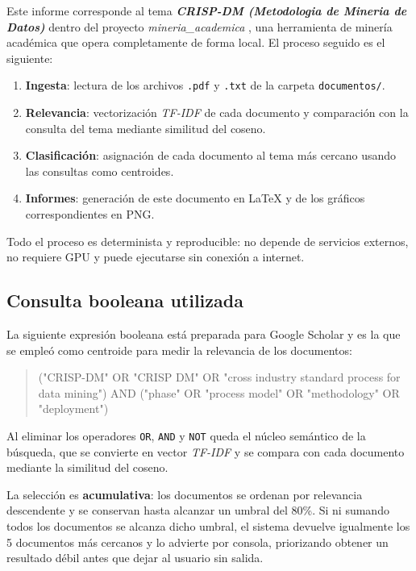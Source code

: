 \documentclass[11pt,a4paper]{article}
\newcommand{\tema}[1]{\textbf{\textit{#1}}}
\newcommand{\pcento}{\%}
\begin{document}
Este informe corresponde al tema \tema{ CRISP-DM (Metodologia de Mineria de Datos) } dentro del
proyecto \textit{ mineria\_academica }, una herramienta de minería académica que
opera completamente de forma local. El proceso seguido es el siguiente:

\begin{enumerate}
  \item \textbf{Ingesta}: lectura de los archivos \texttt{.pdf} y
        \texttt{.txt} de la carpeta \texttt{documentos/}.
  \item \textbf{Relevancia}: vectorización \textit{TF-IDF} de cada documento
        y comparación con la consulta del tema mediante similitud del coseno.
  \item \textbf{Clasificación}: asignación de cada documento al tema más
        cercano usando las consultas como centroides.
  \item \textbf{Informes}: generación de este documento en \LaTeX{} y de los
        gráficos correspondientes en PNG.
\end{enumerate}

Todo el proceso es determinista y reproducible: no depende de servicios
externos, no requiere GPU y puede ejecutarse sin conexión a internet.

\subsection{Consulta booleana utilizada}
\label{sec:query}

La siguiente expresión booleana está preparada para Google Scholar y es la que
se empleó como centroide para medir la relevancia de los documentos:

\begin{quote}
\small\ttfamily
("CRISP-DM" OR "CRISP DM" OR "cross industry standard process for data mining") AND ("phase" OR "process model" OR "methodology" OR "deployment")
\end{quote}

Al eliminar los operadores \texttt{OR}, \texttt{AND} y \texttt{NOT} queda el
núcleo semántico de la búsqueda, que se convierte en vector \textit{TF-IDF} y
se compara con cada documento mediante la similitud del coseno.

La selección es \textbf{acumulativa}: los documentos se ordenan por relevancia
descendente y se conservan hasta alcanzar un umbral del
80\pcento. Si ni sumando todos los documentos se alcanza
dicho umbral, el sistema devuelve igualmente los 5
documentos más cercanos y lo advierte por consola, priorizando obtener un
resultado débil antes que dejar al usuario sin salida.
\end{document}
